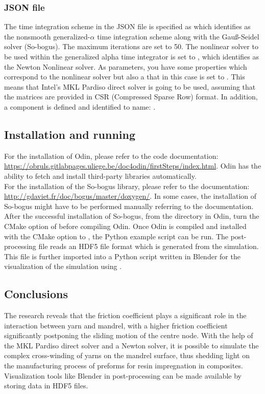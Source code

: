\subsubsection{JSON file}
The time integration scheme in the JSON file is specified as  which identifies as the nonsmooth generalized-$\alpha$ time integration scheme along with the Gau{\ss}-Seidel solver (So-bogus). The maximum iterations are set to 50. The nonlinear solver to be used within the generalized alpha time integrator is set to , which identifies as the Newton Nonlinear solver. As parameters, you have some properties which correspond to the nonlinear solver but also a  that in this case is set to . This means that Intel's MKL Pardiso direct solver is going to be used, assuming that the matrices are provided in CSR (Compressed Sparse Row) format. In addition, a component  is defined and identified to name: .

\subsection{Installation and running}
For the installation of Odin, please refer to the code documentation: \url{https://obruls.gitlabpages.uliege.be/doc4odin/firstSteps/index.html}. Odin has the ability to fetch and install third-party libraries automatically.\\

For the installation of the So-bogus library, please refer to the documentation: \url{http://gdaviet.fr/doc/bogus/master/doxygen/}. In some cases, the installation of So-bogus might have to be performed manually referring to the documentation. After the successful installation of So-bogus, from the  directory in Odin, turn  the CMake option of  before compiling Odin. Once Odin is compiled and installed with the CMake option  to , the Python example script can be run. The post-processing file reads an HDF5 file format which is generated from the simulation. This  file is further imported into a Python script written in Blender for the visualization of the simulation using .

\subsection{Conclusions}
The research reveals that the friction coefficient plays a significant role in the interaction between yarn and mandrel, with a higher friction coefficient significantly postponing the sliding motion of the centre node. 
With the help of the MKL Pardiso direct solver and a Newton solver, it is possible to simulate the complex cross-winding of yarns on the mandrel surface, thus shedding light on the manufacturing process of preforms for resin impregnation in composites. 
Visualization tools like Blender in post-processing can be made available by storing data in HDF5 files.




